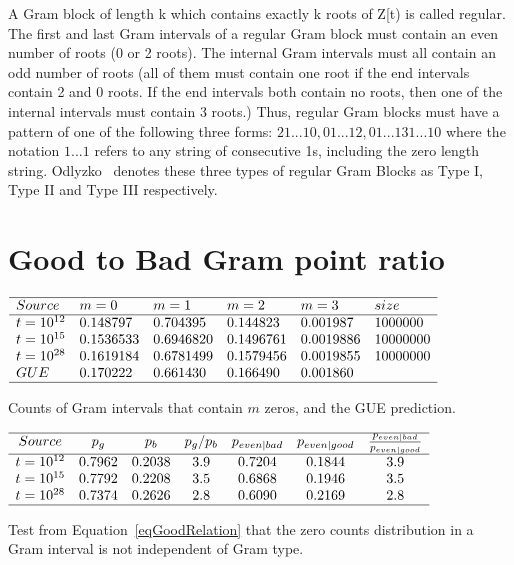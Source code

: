 \documentclass[twoside]{article}
\begin{document}
A Gram block of length k which contains exactly k roots of Z[t) is called regular. The first and last Gram intervals of a regular Gram block must contain an even number of roots (0 or 2 roots). The internal Gram intervals must all contain an odd number of roots (all of them must contain one root if the end intervals contain 2 and 0 roots. If the end intervals both contain no roots, then one of the internal intervals must contain 3 roots.) 
Thus, regular Gram blocks must have a pattern of one of the following three forms:
$21 . . . 10, 01 . . . 12, 01 . . . 131 . . . 10$
where the notation $1 . . . 1$ refers to any string of consecutive 1s, including the zero length string. Odlyzko~\cite{Odlyzko 1992} denotes these three types of regular Gram Blocks as Type I, Type II and Type III respectively.  

\section{\label{sec5}Good to Bad Gram point ratio}

\begin{table}
\centering \(\begin{array}{llllll}
\hline
Source &m = 0&m = 1&m = 2&m = 3&size\\
\hline
t = 10^{12}&0.148797&0.704395&0.144823&0.001987&1000000\\
t = 10^{15}&0.1536533&0.6946820&0.1496761&0.0019886&10000000\\
t = 10^{28}&0.1619184&0.6781499&0.1579456&0.0019855&10000000\\
 GUE&0.170222&0.661430&0.166490&0.001860&\\
\hline
\end{array}\)
\caption{Counts of Gram intervals that contain $m$ zeros, and the GUE prediction.} \label{tab:intervalzeros}
\end{table}

\begin{table}
\centering \(\begin{array}{ccccccc}
\hline
Source &p_g&p_b& p_g/p_b&p_{even|bad} &p_{even|good}&\frac{p_{even|bad}}{p_{even|good}}\\
\hline
t = 10^{12}&0.7962&0.2038&3.9&0.7204&0.1844&3.9\\
t = 10^{15}&0.7792&0.2208&3.5&0.6868&0.1946&3.5\\
t = 10^{28}&0.7374&0.2626&2.8&0.6090&0.2169&2.8\\
\hline
\end{array}\)
\caption{Test from  Equation~\ref{eqGoodRelation} that the zero counts distribution in a Gram interval is not independent of Gram type.} \label{tab:pevenpred}
\end{table}
\end{document}
